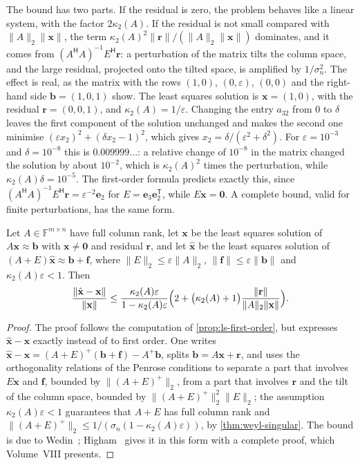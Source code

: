 The bound has two parts. If the residual is zero, the problem behaves like a linear system, with the factor $2\kappa_2(A)$. If the residual is not small compared with $\|A\|_2\|\mathbf x\|$, the term $\kappa_2(A)^2\|\mathbf r\|/(\|A\|_2\|\mathbf x\|)$ dominates, and it comes from $(A^{\mathsf H}A)^{-1}E^{\mathsf H}\mathbf r$: a perturbation of the matrix tilts the column space, and the large residual, projected onto the tilted space, is amplified by $1/\sigma_n^2$. The effect is real, as the matrix with the rows $(1,0)$, $(0,\varepsilon)$, $(0,0)$ and the right-hand side $\mathbf b=(1,0,1)$ show. The least squares solution is $\mathbf x=(1,0)$, with the residual $\mathbf r=(0,0,1)$, and $\kappa_2(A)=1/\varepsilon$. Changing the entry $a_{32}$ from $0$ to $\delta$ leaves the first component of the solution unchanged and makes the second one minimise $(\varepsilon x_2)^2+(\delta x_2-1)^2$, which gives $x_2=\delta/(\varepsilon^2+\delta^2)$. For $\varepsilon=10^{-3}$ and $\delta=10^{-8}$ this is $0.009999\ldots$: a relative change of $10^{-8}$ in the matrix changed the solution by about $10^{-2}$, which is $\kappa_2(A)^2$ times the perturbation, while $\kappa_2(A)\delta=10^{-5}$. The first-order formula predicts exactly this, since $(A^{\mathsf H}A)^{-1}E^{\mathsf H}\mathbf r=\varepsilon^{-2}\mathbf e_2$ for $E=\mathbf e_3\mathbf e_2^{\mathsf T}$, while $E\mathbf x=\mathbf 0$. A complete bound, valid for finite perturbations, has the same form.

\begin{theorem}
\label{thm:ls-sensitivity}
Let $A\in\mathbb F^{m\times n}$ have full column rank, let $\mathbf x$ be the least squares solution of $A\mathbf x\approx\mathbf b$ with $\mathbf x\ne\mathbf 0$ and residual $\mathbf r$, and let $\hat{\mathbf x}$ be the least squares solution of $(A+E)\hat{\mathbf x}\approx\mathbf b+\mathbf f$, where $\|E\|_2\le\varepsilon\|A\|_2$, $\|\mathbf f\|\le\varepsilon\|\mathbf b\|$ and $\kappa_2(A)\varepsilon<1$. Then
\[
\frac{\|\hat{\mathbf x}-\mathbf x\|}{\|\mathbf x\|}\le\frac{\kappa_2(A)\varepsilon}{1-\kappa_2(A)\varepsilon}\Bigl(2+\bigl(\kappa_2(A)+1\bigr)\frac{\|\mathbf r\|}{\|A\|_2\|\mathbf x\|}\Bigr).
\]
\end{theorem}

\begin{proof}
The proof follows the computation of \cref{prop:ls-first-order}, but expresses $\hat{\mathbf x}-\mathbf x$ exactly instead of to first order. One writes $\hat{\mathbf x}-\mathbf x=(A+E)^+(\mathbf b+\mathbf f)-A^+\mathbf b$, splits $\mathbf b=A\mathbf x+\mathbf r$, and uses the orthogonality relations of the Penrose conditions to separate a part that involves $E\mathbf x$ and $\mathbf f$, bounded by $\|(A+E)^+\|_2$, from a part that involves $\mathbf r$ and the tilt of the column space, bounded by $\|(A+E)^+\|_2^2\|E\|_2$; the assumption $\kappa_2(A)\varepsilon<1$ guarantees that $A+E$ has full column rank and $\|(A+E)^+\|_2\le1/(\sigma_n(1-\kappa_2(A)\varepsilon))$, by \cref{thm:weyl-singular}. The bound is due to Wedin~\cite{wedin1973}; Higham~\cite[Thm.~20.1]{higham2002accuracy} gives it in this form with a complete proof, which Volume~VIII presents.
\end{proof}

